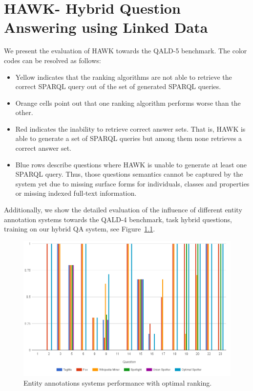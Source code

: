\chapter{HAWK- Hybrid Question Answering using Linked Data}
\label{cha:app_hawk}


We present the evaluation of HAWK towards the \ac{QALD}-5 benchmark. The color codes can be resolved as follows:
\begin{itemize}
\item Yellow indicates that the ranking algorithms are not able to retrieve the correct SPARQL query out of the set of generated SPARQL queries. 
\item Orange cells point out that one ranking algorithm performs worse than the other. 
\item Red indicates the inability to retrieve correct answer sets.
That is, HAWK is able to generate a set of SPARQL queries but among them none retrieves a correct answer set.
\item Blue rows describe questions where HAWK is unable to generate at least one SPARQL query. Thus, those questions semantics cannot be captured by the system yet due to missing surface forms for individuals, classes and properties or missing indexed full-text information.
\end{itemize}
{
\scriptsize

}
Additionally, we show the detailed evaluation of the influence of different entity annotation systems towards the \ac{QALD}-4 benchmark, task hybrid questions, training on our hybrid \ac{QA} system, see Figure~\ref{chahawk:fig:EntityAnnotators}.
\begin{figure}[htb!]
\centering
\includegraphics[width=\linewidth]{Appendix/fig/bars}
\caption{Entity annotations systems performance with optimal ranking.}
\label{chahawk:fig:EntityAnnotators}
\end{figure}
